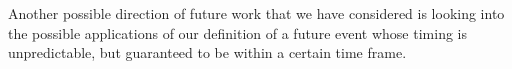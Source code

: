 \documentclass[runningheads]{llncs}
\newenvironment{myindent}{\begin{adjustwidth}{1cm}{}}{\end{adjustwidth}}
\begin{document}
Another possible direction of future work that we have considered is looking into the
possible applications of our definition of a future event whose timing is unpredictable,
but guaranteed to be within a certain time frame.

%
\end{document}

